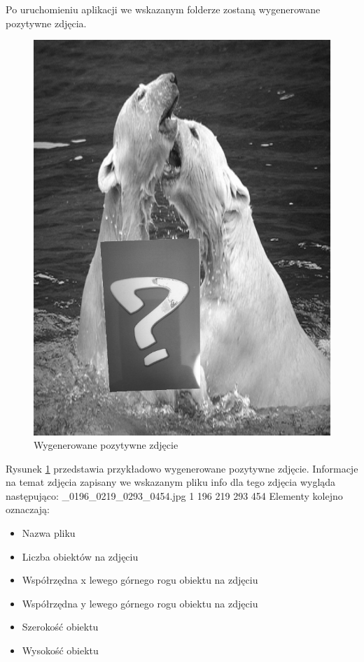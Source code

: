 Po uruchomieniu aplikacji we wskazanym folderze zostaną wygenerowane pozytywne zdjęcia.

\begin{figure}[H]
\centering
\includegraphics[scale=0.2]{imgs/0448_0134_0398_0203_0316.png}
\caption{Wygenerowane pozytywne zdjęcie}\label{misie}
\end{figure}

Rysunek \ref{misie} przedstawia przykładowo wygenerowane pozytywne zdjęcie. Informacje na temat zdjęcia zapisany we wskazanym pliku info dla tego zdjęcia wygląda następująco: \_0196\_0219\_0293\_0454.jpg 1 196 219 293 454
Elementy kolejno oznaczają:

\begin{itemize}
    \item Nazwa pliku
    \item Liczba obiektów na zdjęciu
    \item Współrzędna x lewego górnego rogu obiektu na zdjęciu
    \item Współrzędna y lewego górnego rogu obiektu na zdjęciu
    \item Szerokość obiektu
    \item Wysokość obiektu

\end{itemize}

